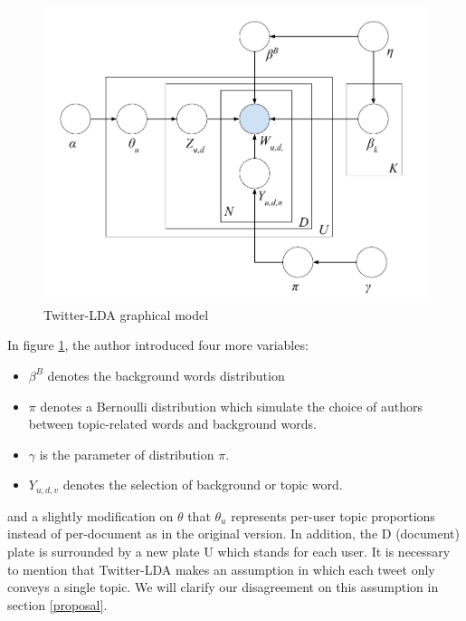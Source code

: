 \documentclass[11pt]{article}
\begin{document}
\begin{figure}[H]
	\centering
	\includegraphics[scale=0.3]{twitter_lda_model}
	\caption{Twitter-LDA graphical model}
	\label{fig:twitter_lda_model}
\end{figure}

In figure \ref{fig:twitter_lda_model}, the author introduced four more variables:
\begin{itemize}
	\item $\beta^B$ denotes the background words distribution
	\item $\pi$ denotes a Bernoulli distribution which simulate the choice of authors between topic-related words and background words.
	\item $\gamma$ is the parameter of distribution $\pi$.
	\item $Y_{u,d,v}$ denotes the selection of background or topic word.
\end{itemize} 
and a slightly modification on $\theta$ that $\theta_u$ represents per-user topic proportions instead of per-document as in the original version. In addition, the D (document) plate is surrounded by a new plate U which stands for each user. It is necessary to mention that Twitter-LDA makes an assumption in which each tweet only conveys a single topic. We will clarify our disagreement on this assumption in section \ref{proposal}.
\end{document}
